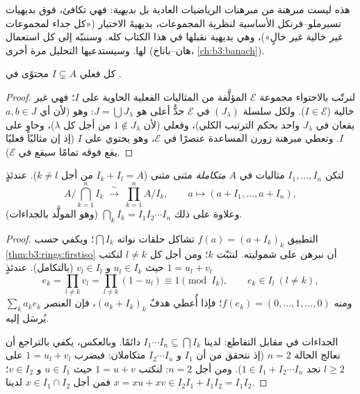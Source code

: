 \begin{remark}\label{rem:b3:rings:zorn}
هذه ليست مبرهنة من مبرهنات الرياضيات العادية بل \emph{بديهية}:
فهي تكافئ، فوق بديهيات تسيرملو--فرنكل الأساسية لنظرية المجموعات،
بديهيةَ الاختيار («كل جداء لمجموعات غير خالية غير خالٍ»)، وهي
بديهية نقبلها في هذا الكتاب كله. وسننبّه إلى كل استعمال لها.
وسيستدعيها التحليل مرة أخرى (هان--باناخ، \cref{ch:b3:banach}).
\end{remark}

\begin{theorem}[كرول]\label{thm:b3:rings:krull}
كل  فعلي $I \subsetneq A$ محتوًى في .
\end{theorem}

\begin{proof}
لنرتّب بالاحتواء مجموعة $\mathcal E$ المؤلَّفة من المثاليات
الفعلية الحاوية على $I$؛ فهي غير خالية ($I \in \mathcal E$). ولكل سلسلة
$(J_\lambda)$ في $\mathcal E$ حدٌّ أعلى هو $J = \bigcup
J_\lambda$: وهو 
(لأن أي $a, b \in J$ يقعان في $J_\lambda$ واحد بحكم الترتيب
الكلي)، وفعلي (لأن $1 \notin J_\lambda$ من أجل كل $\lambda$)، وحاوٍ على $I$.
وتعطي مبرهنة زورن المساعدة عنصرًا  في $\mathcal
E$، وهو  يحتوي على $I$ (إذ إن مثاليًا فعليًا يقع فوقه تمامًا سيقع
في $\mathcal E$).
\end{proof}

\begin{theorem}\label{thm:b3:rings:crt}
لتكن $I_1, \dots, I_n$ مثاليات في $A$ \emph{متكاملة}
مثنى مثنى ($I_k + I_l = A$ من أجل $k \neq l$). عندئذٍ
\[
A\Big/\bigcap_{k=1}^n I_k \;\xrightarrow{\;\sim\;}\;
\prod_{k=1}^n A/I_k,
\qquad
a \longmapsto (a + I_1, \dots, a + I_n),
\]
وعلاوة على ذلك $\bigcap_k I_k = I_1 I_2 \cdots I_n$ (وهو  المولَّد بالجداءات).
\end{theorem}

\begin{proof}
التطبيق $f(a) = (a + I_k)_k$ تشاكل حلقات نواته $\bigcap I_k$؛ ويكفي حسب
\cref{thm:b3:rings:firstiso} أن نبرهن على شموليته. لنثبّت $k$؛ ومن أجل كل
$l \neq k$ لنكتب $1 = u_l +
v_l$ حيث $u_l \in I_k$ و $v_l \in I_l$
(بالتكامل). عندئذٍ
\[
e_k = \prod_{l \neq k} v_l = \prod_{l\neq k}(1 - u_l)
\equiv 1 \pmod{I_k},
\qquad e_k \in I_l \ (l \neq k),
\]
ومنه $f(e_k) = (0, \dots, 1, \dots, 0)$؛ فإذا أُعطي هدفٌ $(a_k +
I_k)_k$، فإن العنصر
$\sum_k a_k e_k$ يُرسَل إليه.

الجداءات في مقابل التقاطع: لدينا $I_1\cdots I_n \subseteq \bigcap I_k$ دائمًا. وبالعكس، يكفي
بالتراجع أن نعالج الحالة $n = 2$ (إذ نتحقق من أن $I_1$
و $I_2\cdots I_n$ متكاملان: فبضرب $1 = u_l + v_l$ على $l \geq 2$
نجد $1 \in I_1 + I_2\cdots
I_n$). ومن أجل $n = 2$: لنكتب $1 = u + v$ حيث $u \in I_1$
و $v \in I_2$؛ فمن أجل $x \in I_1 \cap I_2$ لدينا $x = xu + xv \in I_2I_1 + I_1I_2 =
I_1I_2$.
\end{proof}

